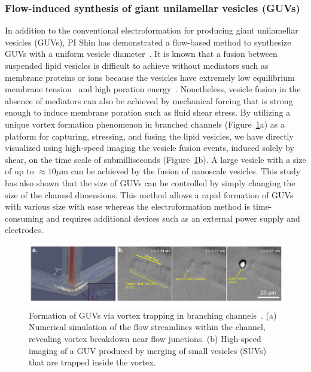 \documentclass[11pt]{article}
\begin{document}
\subsubsection{Flow-induced synthesis of giant unilamellar vesicles
(GUVs)}
\label{subsubsec:GUVs}
In addition to the conventional electroformation for producing giant
unilamellar vesicles (GUVs), PI Shin has demonstrated a flow-based
method to synthesize GUVs with a uniform vesicle
diameter~\cite{shin2015}.  It is known that a fusion between suspended
lipid vesicles is difficult to achieve without mediators such as
membrane proteins or ions because the vesicles have extremely low
equilibrium membrane tension~\cite{jahnig1996} and high poration
energy~\cite{gao2008}.  Nonetheless, vesicle fusion in the absence of
mediators can also be achieved by mechanical forcing that is strong
enough to induce membrane poration such as fluid shear stress.  By
utilizing a unique vortex formation phenomenon in branched channels
(Figure~\ref{fig:fig4}a) as a platform for capturing, stressing, and
fusing the lipid vesicles, we have directly visualized using high-speed
imaging the vesicle fusion events, induced solely by shear, on the time
scale of submilliseconds (Figure~\ref{fig:fig4}b). A large vesicle with
a size of up to $\approx 10\mu$m can be achieved by the fusion of
nanoscale vesicles.  This study has also shown that the size of GUVs can
be controlled by simply changing the size of the channel dimensions.
This method allows a rapid formation of GUVs with various size with ease
whereas the electroformation method is time-consuming and requires
additional devices such as an external power supply and electrodes.
%
\begin{figure}[h]
\begin{center}
\includegraphics*[keepaspectratio=true,scale=1]{figs/fig4.pdf}
  \caption{\label{fig:fig4} Formation of GUVs via vortex trapping in
  branching channels~\cite{shin2015}. (a) Numerical simulation of the
  flow streamlines within the channel, revealing vortex breakdown near
  flow junctions.  (b) High-speed imaging of a GUV produced by merging
  of small vesicles (SUVs) that are trapped inside the vortex.}
\end{center}
\end{figure}
\end{document}

